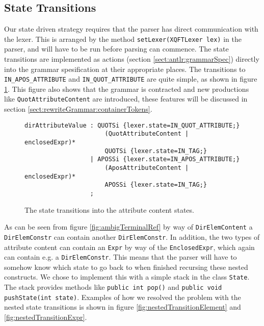 \subsection{State Transitions}
\label{sect:rewriteGrammar:transitions}
Our state driven strategy requires that the parser has direct communication with the lexer. This is arranged by the method \verb!setLexer(XQFTLexer lex)! in the parser, and will have to be run before parsing can commence. The state transitions are implemented as actions (section \ref{sect:antlr:grammarSpec}) directly into the grammar spesification at their appropriate places. The transitions to \verb!IN_APOS_ATTRIBUTE! and \verb!IN_QUOT_ATTRIBUTE! are quite simple, as shown in figure \ref{fig:transitionSimple}. This figure also shows that the grammar is contracted and new productions like \verb!QuotAttributeContent! are introduced, these features will be discussed in section \ref{sect:rewriteGrammar:containerTokens}.
\begin{figure}[h!]
\begin{Verbatim}
dirAttributeValue : QUOTSi {lexer.state=IN_QUOT_ATTRIBUTE;}
                      (QuotAttributeContent | enclosedExpr)* 
                      QUOTSi {lexer.state=IN_TAG;}
                  | APOSSi {lexer.state=IN_APOS_ATTRIBUTE;}
                      (AposAttributeContent | enclosedExpr)* 
                      APOSSi {lexer.state=IN_TAG;}
                  ; 
\end{Verbatim}
\caption[Attribute content state transitions.]{The state transitions into the attribute content states.}
\label{fig:transitionSimple}
\end{figure}

As can be seen from figure \ref{fig:ambigTerminalRef} by way of \verb!DirElemContent! a \verb!DirElemConstr! can contain another \verb!DirElemConstr!. In addition, the two types of attribute content can contain an \verb!Expr! by way of the \verb!EnclosedExpr!, which again can contain e.g. a \verb!DirElemConstr!. This means that the parser will have to somehow know which state to go back to when finished recursing these nested constructs. We chose to implement this with a simple stack in the class \verb!State!. The stack provides methods like \verb!public int pop()! and \verb!public void pushState(int state)!. Examples of how we resolved the problem with the nested state transitions is shown in figure \ref{fig:nestedTransitionElement} and \ref{fig:nestedTransitionExpr}.

